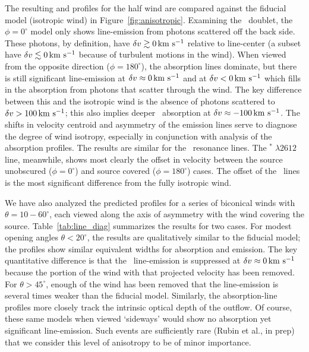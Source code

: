\documentclass[12pt,preprint]{aastex}
\begin{document}
The resulting  and
 profiles for the half wind are compared against the fiducial model
(isotropic wind) in Figure~\ref{fig:anisotropic}.  
Examining the \mgiid\ doublet, 
the $\phi = 0^\circ$ model only shows
line-emission from photons scattered
off the back side.  These photons, by definition, have $\delta v \gtrsim 0 \, {\rm km~s^{-1}}$
relative to line-center (a subset have $\delta v \lesssim 0 \, {\rm km~s^{-1}}$ because
of turbulent motions in the wind). 
When viewed from the opposite direction ($\phi = 180^\circ$), the
absorption lines dominate, but there is still significant
line-emission at $\delta v \approx 0 \, {\rm km~s^{-1}}$ and at $\delta v < 0 \, {\rm km~s^{-1}}$ which fills
in the absorption from photons that scatter through the wind.  The
key difference between this and the isotropic wind is the absence of photons
scattered to $\delta v > 100 \, {\rm km~s^{-1}}$;  this also implies deeper 
\mgiib\ absorption at $\delta v \approx -100 \, {\rm km~s^{-1}}$. The 
shifts in velocity centroid and asymmetry of the emission lines
serve to diagnose the degree of wind isotropy, especially in
conjunction with analysis of the absorption profiles. 
The results are similar for the \feiid\ resonance lines.  The
$^* \; \lambda 2612$ line, meanwhile, shows most clearly the
offset in velocity between the source unobscured ($\phi = 0^\circ$)
and source covered ($\phi = 180^\circ$) cases.  The offset of the
\feiis\ lines is the most significant 
difference from the fully isotropic wind.

We have also analyzed the predicted profiles for a series of biconical
winds with $\theta = 10-60^\circ$, each viewed along the axis of
asymmetry with the wind covering the source.
Table~\ref{tab:line_diag} summarizes the results for two cases.  For
modest opening angles $\theta < 20^\circ$, the results are
qualitatively similar to the fiducial model;  the profiles show
similar equivalent widths for absorption and emission.  The key
quantitative difference is that the \feiis\ line-emission is
suppressed at $\delta v \approx 0 \, {\rm km~s^{-1}}$ because the portion of the
wind with that projected velocity has been removed.  For
$\theta>45^\circ$, enough of the wind has been removed that the
line-emission is several times weaker than the fiducial model.
Similarly, the absorption-line profiles more closely track the
intrinsic optical depth of the outflow.   Of course, these same models
when viewed `sideways' would show no absorption yet significant
line-emission.  Such events are sufficiently rare (Rubin et
al., in prep) that we consider this level of anisotropy to be of minor
importance.
\end{document}
